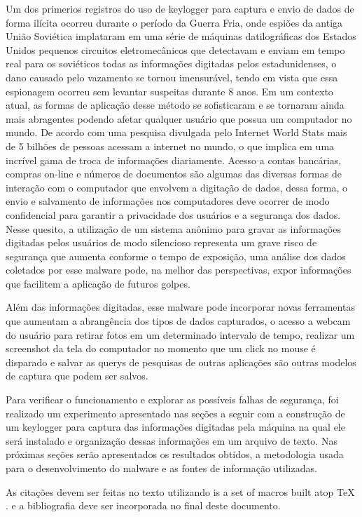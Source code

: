 \documentclass[applsci,article,submit,pdftex,moreauthors]{Definitions/mdpi}
\begin{document}
Um dos primerios registros do uso de keylogger para captura e envio de dados de forma ilícita ocorreu durante o período da Guerra Fria, onde espiões da antiga União Soviética implataram em uma série de máquinas datilográficas dos Estados Unidos pequenos circuitos eletromecânicos que detectavam e enviam em tempo real para os soviéticos todas as informações digitadas pelos estadunidenses, o dano causado pelo vazamento se tornou imensurável, tendo em vista que essa espionagem ocorreu sem levantar suspeitas  durante 8 anos. Em um contexto atual, as formas de aplicação desse método se sofisticaram e se tornaram ainda mais abragentes podendo afetar qualquer usuário que possua um computador no mundo. 
De acordo com uma pesquisa divulgada pelo Internet World Stats mais de 5 bilhões de pessoas acessam a internet no mundo, o que implica em uma incrível gama de troca de informações diariamente. Acesso a contas bancárias, compras on-line e números de documentos são algumas das diversas formas de interação com o computador que envolvem a digitação de dados,  dessa forma, o envio e salvamento de informações nos computadores deve ocorrer de modo confidencial para garantir a privacidade dos usuários e a segurança dos dados. Nesse quesito, a utilização de um sistema anônimo para gravar as informações digitadas pelos usuários de modo silencioso representa um grave risco de segurança que aumenta conforme o tempo de exposição, uma análise dos dados coletados por esse malware pode, na melhor das perspectivas, expor informações que facilitem a aplicação de futuros golpes.

Além das informações digitadas, esse malware pode incorporar novas ferramentas que aumentam a abrangência dos tipos de dados capturados, o acesso a webcam do usuário para retirar fotos em um determinado intervalo de tempo, realizar um screenshot da tela do computador no momento que um click no mouse é disparado e salvar as querys de pesquisas de outras aplicações são outras modelos de captura que podem ser salvos. 
 
Para verificar o funcionamento e explorar as possíveis falhas de segurança, foi realizado um experimento apresentado nas seções a seguir com a construção de um keylogger para captura das informações digitadas pela máquina na qual ele será instalado e organização dessas informações em um arquivo de texto. Nas próximas seções serão apresentados os resultados obtidos, a metodologia usada para o desenvolvimento do malware e as fontes de informação utilizadas. 

As citações devem ser feitas no texto utilizando \cite{lamport94} is a set of macros built atop \TeX{} \cite{texbook}. e a bibliografia deve ser incorporada no final deste documento.
\end{document}
